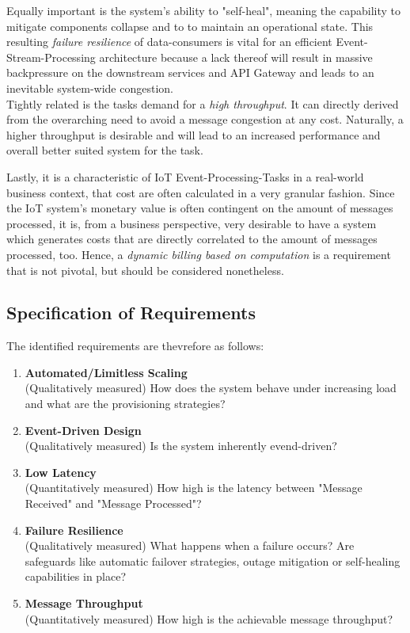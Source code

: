 Equally important is the system's ability to "self-heal", meaning the capability to mitigate components collapse and to to maintain an operational state. This resulting \textit{failure resilience} of data-consumers is vital for an efficient Event-Stream-Processing architecture because a lack thereof will result in massive backpressure on the downstream services and API Gateway and leads to an inevitable system-wide congestion.\\
Tightly related is the tasks demand for a \textit{high throughput}. It can directly derived from the overarching need to avoid a message congestion at any cost. Naturally, a higher throughput is desirable and will lead to an increased performance and overall better suited system for the task.

Lastly, it is a characteristic of IoT Event-Processing-Tasks in a real-world business context, that cost are often calculated in a very granular fashion. Since the IoT system's monetary value is often contingent on the amount of messages processed, it is, from a business perspective, very desirable to have a system which generates costs that are directly correlated to the amount of messages processed, too. Hence, a \textit{dynamic billing based on computation} is a requirement that is not pivotal, but should be considered nonetheless.

\subsection{Specification of Requirements}

The identified requirements are thevrefore as follows:

\begin{enumerate}
    \item \textbf{Automated/Limitless Scaling}\\
        (Qualitatively measured) How does the system behave under increasing load and what are the provisioning strategies?
    \item \textbf{Event-Driven Design}\\
        (Qualitatively measured) Is the system inherently evend-driven?
    \item \textbf{Low Latency}\\
        (Quantitatively measured) How high is the latency between "Message Received" and "Message Processed"?
    \item \textbf{Failure Resilience}\\
        (Qualitatively measured) What happens when a failure occurs? Are safeguards like automatic failover strategies, outage mitigation or self-healing capabilities in place?
    \item \textbf{Message Throughput}\\
        (Quantitatively measured) How high is the achievable message throughput?
\end{enumerate}



